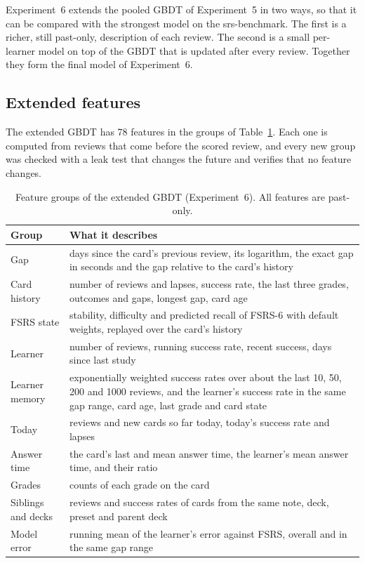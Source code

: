 Experiment~6 extends the pooled GBDT of Experiment~5 in two ways, so that it can be compared with the strongest model on
the srs-benchmark. The first is a richer, still past-only, description of each review. The second is a small per-learner
model on top of the GBDT that is updated after every review. Together they form the final model of Experiment~6.

\subsection{Extended features}
\label{sec:method-gbdt-ext-features}

The extended GBDT has 78 features in the groups of Table~\ref{tab:gbdt-ext-features}. Each one is computed from reviews that
come before the scored review, and every new group was checked with a leak test that changes the future and verifies that
no feature changes.

\begin{table}[htbp]
  \centering
  \caption[Feature groups of the extended GBDT]{Feature groups of the extended GBDT (Experiment~6). All features are past-only.}
  \label{tab:gbdt-ext-features}
  \begin{tabular}{@{}p{3.6cm}p{10.6cm}@{}}
    \toprule
    Group & What it describes \\
    \midrule
    Gap & days since the card's previous review, its logarithm, the exact gap in seconds and the gap relative to the card's history \\
    Card history & number of reviews and lapses, success rate, the last three grades, outcomes and gaps, longest gap, card age \\
    FSRS state & stability, difficulty and predicted recall of FSRS-6 with default weights, replayed over the card's history \\
    Learner & number of reviews, running success rate, recent success, days since last study \\
    Learner memory & exponentially weighted success rates over about the last 10, 50, 200 and 1000 reviews, and the learner's success rate in the same gap range, card age, last grade and card state \\
    Today & reviews and new cards so far today, today's success rate and lapses \\
    Answer time & the card's last and mean answer time, the learner's mean answer time, and their ratio \\
    Grades & counts of each grade on the card \\
    Siblings and decks & reviews and success rates of cards from the same note, deck, preset and parent deck \\
    Model error & running mean of the learner's error against FSRS, overall and in the same gap range \\
    \bottomrule
  \end{tabular}
\end{table}

